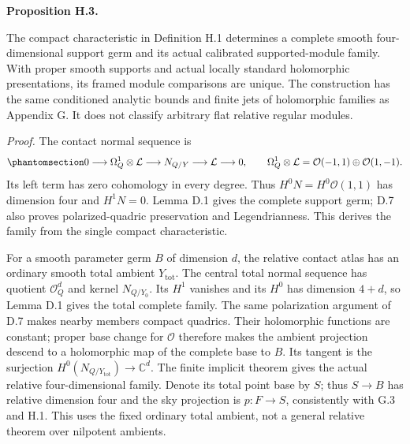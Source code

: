 \documentclass[
  english,
  11pt,
  reqno]{amsart}
\makeatletter
\newcommand{\pandocstatementheading}[1]{%
  \par\addpenalty{\@beginparpenalty}%
  \addvspace{.5\baselineskip plus .2\baselineskip minus .2\baselineskip}%
  {\normalfont\bfseries #1\par}%
  \nobreak\@afterindenttrue\@afterheading
}
\makeatother
\begin{document}
\pandocstatementheading{\protect{}\label{prop:gg-independent-module-points}Proposition H.3.}

The compact characteristic in Definition H.1 determines a complete
smooth four-dimensional support germ and its actual calibrated
supported-module family. With proper smooth supports and actual locally
standard holomorphic presentations, its framed module comparisons are
unique. The construction has the same conditioned analytic bounds and
finite jets of holomorphic families as Appendix G. It does not classify
arbitrary flat relative regular modules.

\emph{Proof.} The contact normal sequence is
\begin{equation}\protect\phantomsection\label{eq:gg-independent-op-normal-sequence}{
 0\longrightarrow\Omega_Q^1\otimes\mathcal L
   \longrightarrow N_{Q/Y}\longrightarrow\mathcal L
   \longrightarrow0,\qquad
 \Omega_Q^1\otimes\mathcal L
     =\mathcal O(-1,1)\oplus\mathcal O(1,-1).
}\end{equation} Its left term has zero cohomology in every degree. Thus
\(H^0N=H^0\mathcal O(1,1)\) has dimension four and \(H^1N=0\). Lemma D.1
gives the complete support germ; D.7 also proves polarized-quadric
preservation and Legendrianness. This derives the family from the single
compact characteristic.

For a smooth parameter germ \(B\) of dimension \(d\), the relative
contact atlas has an ordinary smooth total ambient \(Y_{\mathrm{tot}}\).
The central total normal sequence has quotient \(\mathcal O_Q^d\) and
kernel \(N_{Q/Y_0}\). Its \(H^1\) vanishes and its \(H^0\) has dimension
\(4+d\), so Lemma D.1 gives the total complete family. The same
polarization argument of D.7 makes nearby members compact quadrics.
Their holomorphic functions are constant; proper base change for
\(\mathcal O\) therefore makes the ambient projection descend to a
holomorphic map of the complete base to \(B\). Its tangent is the
surjection \(H^0(N_{Q/Y_{\mathrm{tot}}})\to\mathbb C^d\). The finite
implicit theorem gives the actual relative four-dimensional family.
Denote its total point base by \(S\); thus \(S\to B\) has relative
dimension four and the sky projection is \(p:F\to S\), consistently with
G.3 and H.1. This uses the fixed ordinary total ambient, not a general
relative theorem over nilpotent ambients.
\end{document}
